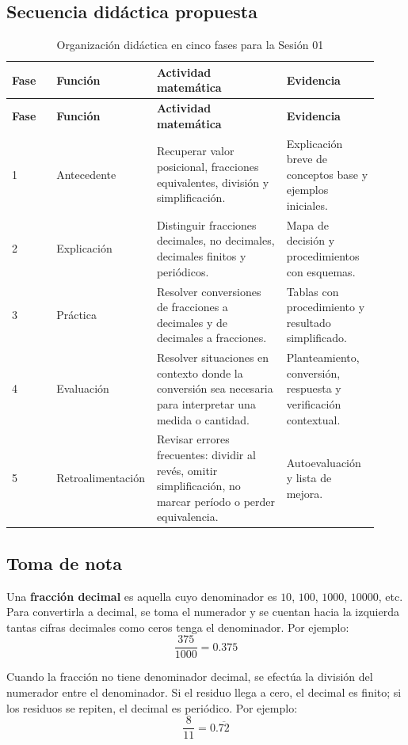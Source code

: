 \documentclass[
	spanish,
	letterpaper, oneside
]{article}
\begin{document}
\subsection{Secuencia didáctica propuesta}

\begin{longtable}{@{}p{0.12\linewidth}p{0.20\linewidth}p{0.35\linewidth}p{0.25\linewidth}@{}}
	\caption{Organización didáctica en cinco fases para la Sesión 01}\label{tab:fases-sesion01}\\
	\toprule
	\textbf{Fase} & \textbf{Función} & \textbf{Actividad matemática} & \textbf{Evidencia} \\
	\midrule
	\endfirsthead
	\toprule
	\textbf{Fase} & \textbf{Función} & \textbf{Actividad matemática} & \textbf{Evidencia} \\
	\midrule
	\endhead
	1 & Antecedente & Recuperar valor posicional, fracciones equivalentes, división y simplificación. & Explicación breve de conceptos base y ejemplos iniciales. \\
	2 & Explicación & Distinguir fracciones decimales, no decimales, decimales finitos y periódicos. & Mapa de decisión y procedimientos con esquemas. \\
	3 & Práctica & Resolver conversiones de fracciones a decimales y de decimales a fracciones. & Tablas con procedimiento y resultado simplificado. \\
	4 & Evaluación & Resolver situaciones en contexto donde la conversión sea necesaria para interpretar una medida o cantidad. & Planteamiento, conversión, respuesta y verificación contextual. \\
	5 & Retroalimentación & Revisar errores frecuentes: dividir al revés, omitir simplificación, no marcar período o perder equivalencia. & Autoevaluación y lista de mejora. \\
	\bottomrule
\end{longtable}

\subsection{Toma de nota}

Una \textbf{fracción decimal} es aquella cuyo denominador es $10$, $100$, $1000$, $10000$, etc. Para convertirla a decimal, se toma el numerador y se cuentan hacia la izquierda tantas cifras decimales como ceros tenga el denominador. Por ejemplo:
\[
	\frac{375}{1000}=0{.}375
\]

Cuando la fracción no tiene denominador decimal, se efectúa la división del numerador entre el denominador. Si el residuo llega a cero, el decimal es finito; si los residuos se repiten, el decimal es periódico. Por ejemplo:
\[
	\frac{8}{11}=0{.}\overline{72}
\]
\end{document}
